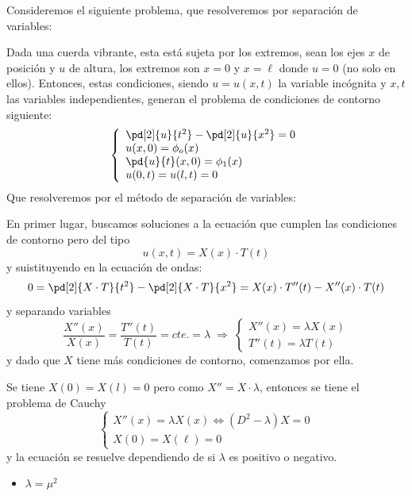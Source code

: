     Consideremos el siguiente problema, que resolveremos por separación de variables:

    \begin{eje} Dada una cuerda vibrante, esta está sujeta por los extremos, sean los ejes $x$ de posición y $u$ de altura, los extremos son $x=0$ y $x=\ell$ donde $u=0$ (no solo en ellos). Entonces, estas condiciones, siendo $u=u(x,t)$ la variable incógnita y $x,t$ las variables independientes, generan el problema de condiciones de contorno siguiente:
    $$\left\{ \begin{array}{l}
         \pd[2]{u}{t^2} -\pd[2]{u}{x^2}=0  \\
         u(x,0)=\phi_o(x) \\
         \pd{u}{t}(x,0)=\phi_1(x) \\
         u(0,t)=u(l,t)=0
    \end{array}
    \right.$$
    Que resolveremos por el método de separación de variables:
    
    En primer lugar, buscamos soluciones a la ecuación que cumplen las condiciones de contorno pero del tipo 
        $$u(x,t)=X(x) \cdot T(t)$$
        y suistituyendo en la ecuación de ondas:
        $$0=\pd[2]{X \cdot T}{t^2} -\pd[2]{X \cdot T}{x^2}=X(x) \cdot T''(t)-X''(x) \cdot T(t)$$
        y separando variables
        $$\dfrac{X''(x)}{X(x)}=\dfrac{T''(t)}{T(t)}=cte.=\lambda \; \Rightarrow \; \left\{ \begin{array}{l}
        X''(x)=\lambda X(x) \\ T''(t)=\lambda T(t)
    \end{array}
    \right.$$
    y dado que $X$ tiene más condiciones de contorno, comenzamos por ella.
    
    Se tiene $X(0)=X(l)=0$ pero como $X''=X \cdot \lambda$, entonces se tiene el problema de Cauchy
        $$ \left\{ \begin{array}{l}
        X''(x)=\lambda X(x) \iff (D^2-\lambda)X=0 \\ X(0)=X(\ell)=0
    \end{array}
    \right.$$
    y la ecuación se resuelve dependiendo de si $\lambda$ es positivo o negativo. 
    \begin{itemize}
        \item \underline{$\lambda=\mu^2$}


\end{itemize}
\end{eje}
